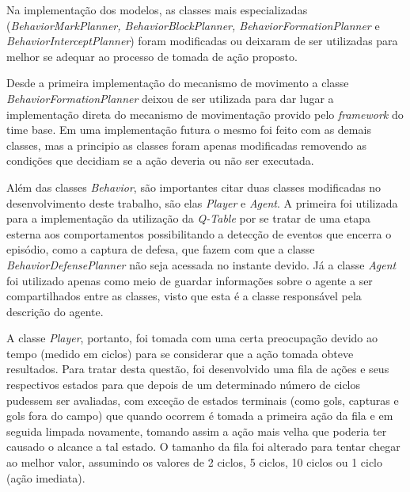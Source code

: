 
Na implementação dos modelos, as classes mais especializadas
(\textit{BehaviorMarkPlanner, BehaviorBlockPlanner, BehaviorFormationPlanner} e
\textit{BehaviorInterceptPlanner}) foram modificadas ou deixaram de ser
utilizadas para melhor se adequar ao processo de tomada de ação proposto.

Desde a primeira implementação do mecanismo de movimento a classe
\textit{BehaviorFormationPlanner} deixou de ser utilizada para dar lugar a
implementação direta do mecanismo de movimentação provido pelo
\textit{framework} do time base. Em uma implementação futura o mesmo foi feito
com as demais classes, mas a principio as classes foram apenas modificadas
removendo as condições que decidiam se a ação deveria ou não ser executada.

Além das classes \textit{Behavior}, são importantes citar duas classes
modificadas no desenvolvimento deste trabalho, são elas \textit{Player} e
\textit{Agent}. A primeira foi utilizada para a implementação da utilização da
\textit{Q-Table} por se tratar de uma etapa esterna aos comportamentos
possibilitando a detecção de eventos que encerra o episódio, como a captura de
defesa, que fazem com que a classe \textit{BehaviorDefensePlanner} não seja
acessada no instante devido. Já a classe \textit{Agent} foi utilizado apenas
como meio de guardar informações sobre o agente a ser compartilhados entre as
classes, visto que esta é a classe responsável pela descrição do agente.

A classe \textit{Player}, portanto, foi tomada com uma certa preocupação devido
ao tempo (medido em ciclos) para se considerar que a ação tomada obteve
resultados. Para tratar desta questão, foi desenvolvido uma fila de ações e seus
respectivos estados para que depois de um determinado número de ciclos pudessem
ser avaliadas, com exceção de estados terminais (como gols, capturas e gols fora
do campo) que quando ocorrem é tomada a primeira ação da fila e em seguida
limpada novamente, tomando assim a ação mais velha que poderia ter causado o
alcance a tal estado. O tamanho da fila foi alterado para tentar chegar ao
melhor valor, assumindo os valores de 2 ciclos, 5 ciclos, 10 ciclos ou 1 ciclo
(ação imediata).


